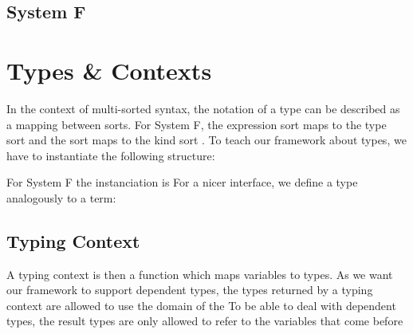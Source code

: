 \documentclass[sigplan,10pt, anonymous]{acmart}
\newenvironment{LibCode*}{%
  \begin{tcolorbox}[%
    colframe=white,%
    boxrule=0.0pt,%
    top=2.5pt,%
    left=2.5pt,%
    bottom=2.5pt,%
    right=2.5pt,%
    boxsep=0pt%
  ]\vspace{-0.2\baselineskip}%
}{%
  \vspace{-1\baselineskip}%
  \end{tcolorbox}%
}
\newcommand*\LibCode[1]{\begin{LibCode*}{#1}\end{LibCode*}}
\newcommand*\AppCode[1]{{#1}}
\newcommand*\ACode[1]{\AgdaFontStyle{\textcolor{mygray}{#1}}}
\newcommand*\ACon[1]{\AgdaInductiveConstructor{#1}}
\begin{document}
  \LibCode\KComposeKit
  \LibCode\KComposition
  \LibCode\KComposeKitAp
  \LibCode\KDistLiftCompose
  \LibCode\KComposeKitNotation
  \LibCode\KComposeTraversal
  \LibCode\KCommLiftWeaken
  \LibCode\KCommLiftWeakenTraverse
  \LibCode\KComposeKitInstances
  \LibCode\KComposeKitInstancesConcrete
  \LibCode\KWeakenCancelsSingle
  \LibCode\KWeakenCancelsSingleTraverse
  \LibCode\KDistLiftSingle
  \LibCode\KDistLiftSingleTraverse

  \subsection{System F}
  \AppCode\FAssoc
  \AppCode\FAssocProofInteresting
  \AppCode\FComposeTraversal

  \section{Types \& Contexts}
  \label{sec:types}

  In the context of multi-sorted syntax, the notation of a type can be
  described as a mapping between sorts.
  For System F, the expression sort \ACode{\ACon{𝕖}} maps to the type sort
  \ACode{\ACon{𝕥}} and the sort \ACode{\ACon{𝕥}} maps to the kind sort
  \ACode{\ACon{𝕜}}.
  To teach our framework about types, we have to instantiate the following structure:
  \LibCode\KTypeSorts
  For System F the instanciation is
  \AppCode\FTypes
  For a nicer interface, we define a type analogously to a term:
  \LibCode\KTypes

  \subsection{Typing Context}
  A typing context is then a function which maps variables to types.
  As we want our framework to support dependent types, the types returned by
  a typing context are allowed to use the domain of the 
  To be able to deal with dependent types, the result types are only allowed
  to refer to the variables that come before 
  \LibCode\KContextHelper
  \LibCode\KContexts
  \LibCode\KContextLookup
\end{document}

